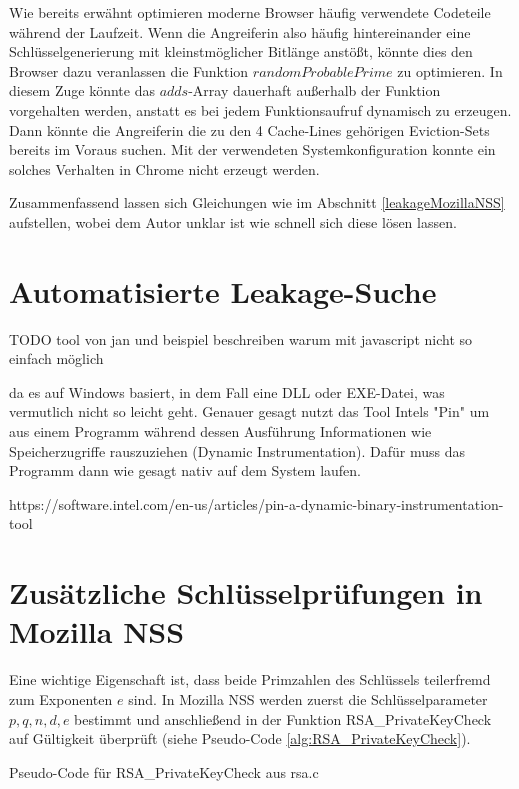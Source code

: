 Wie bereits erwähnt optimieren moderne Browser häufig verwendete Codeteile während der Laufzeit.
Wenn die Angreiferin also häufig hintereinander eine Schlüsselgenerierung mit kleinstmöglicher Bitlänge anstößt, könnte dies den Browser dazu veranlassen die Funktion $randomProbablePrime$ zu optimieren. 
In diesem Zuge könnte das $adds$-Array dauerhaft außerhalb der Funktion vorgehalten werden, anstatt es bei jedem Funktionsaufruf dynamisch zu erzeugen.
Dann könnte die Angreiferin die zu den 4 Cache-Lines gehörigen Eviction-Sets bereits im Voraus suchen.
Mit der verwendeten Systemkonfiguration konnte ein solches Verhalten in Chrome nicht erzeugt werden.

Zusammenfassend lassen sich Gleichungen wie im Abschnitt \ref{leakageMozillaNSS} aufstellen, wobei dem Autor unklar ist wie schnell sich diese lösen lassen.

\section{Automatisierte Leakage-Suche}

TODO tool von jan und beispiel beschreiben
warum mit javascript nicht so einfach möglich

 da es auf Windows basiert, in dem Fall eine DLL
oder EXE-Datei, was vermutlich nicht so leicht geht. Genauer gesagt
nutzt das Tool Intels "Pin" um aus einem Programm während dessen
Ausführung Informationen wie Speicherzugriffe rauszuziehen (Dynamic
Instrumentation). Dafür muss das Programm dann wie gesagt nativ auf dem
System laufen.

https://software.intel.com/en-us/articles/pin-a-dynamic-binary-instrumentation-tool


\section{Zusätzliche Schlüsselprüfungen in Mozilla NSS}
\label{RSAGenGCDAttack}

Eine wichtige Eigenschaft ist, dass beide Primzahlen des Schlüssels teilerfremd zum Exponenten $e$ sind.
In Mozilla NSS werden zuerst die Schlüsselparameter $p,q,n,d,e$ bestimmt und anschließend in der Funktion RSA_PrivateKeyCheck auf Gültigkeit überprüft (siehe Pseudo-Code \ref{alg:RSA_PrivateKeyCheck}).

\begin{algorithm}[h]
\DontPrintSemicolon
\caption{Pseudo-Code für RSA_PrivateKeyCheck aus rsa.c}
\label{alg:RSA_PrivateKeyCheck}

\end{algorithm}

